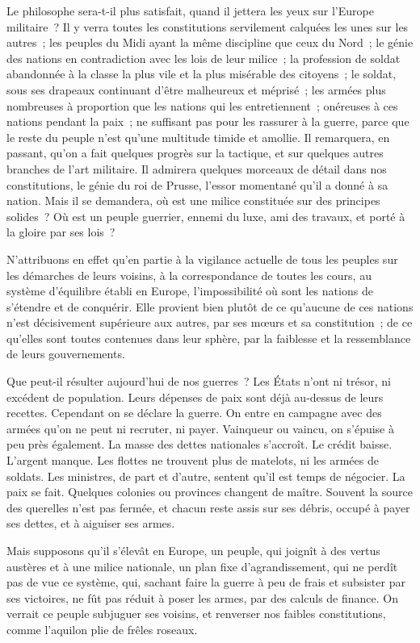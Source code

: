 \documentclass[french,twoside]{book} %
\begin{document}
Le philosophe sera-t-il plus satisfait, quand il jettera les yeux sur l’Europe militaire ? Il y verra toutes les constitutions servilement calquées les unes sur les autres ; les peuples du Midi ayant la même discipline que ceux du Nord ; le génie des nations en contradiction avec les lois de leur milice ; la profession de soldat abandonnée à la classe la plus vile et la plus misérable des citoyens ; le soldat, sous ses drapeaux continuant d’être malheureux et méprisé ; les armées plus nombreuses à proportion que les nations qui les entretiennent ; onéreuses à ces nations pendant la paix ; ne suffisant pas pour les rassurer à la guerre, parce que le reste du peuple n’est qu’une multitude timide et amollie. Il remarquera, en passant, qu’on a fait quelques progrès sur la tactique, et sur quelques autres branches de l’art militaire. Il admirera quelques morceaux de détail dans nos constitutions, le génie du roi de Prusse, l’essor momentané qu’il a donné à sa nation. Mais il se demandera, où est une milice constituée sur des principes solides ? Où est un peuple guerrier, ennemi du luxe, ami des travaux, et porté à la gloire par ses lois ?\par
N’attribuons en effet qu’en partie à la vigilance actuelle de tous les peuples sur les démarches de leurs voisins, à la correspondance de toutes les cours, au système d’équilibre établi en Europe, l’impossibilité où sont les nations de s’étendre et de conquérir. Elle provient bien plutôt de ce qu’aucune de ces nations n’est décisivement supérieure aux autres, par ses mœurs et sa constitution ; de ce qu’elles sont toutes contenues dans leur sphère, par la faiblesse et la ressemblance de leurs gouvernements.\par
Que peut-il résulter aujourd’hui de nos guerres ? Les États n’ont ni trésor, ni excédent de population. Leurs dépenses de paix sont déjà au-dessus de leurs recettes. Cependant on se déclare la guerre. On entre en campagne avec des armées qu’on ne peut ni recruter, ni payer. Vainqueur ou vaincu, on s’épuise à peu près également. La masse des dettes nationales s’accroît. Le crédit baisse. L’argent manque. Les flottes ne trouvent plus de matelots, ni les armées de soldats. Les ministres, de part et d’autre, sentent qu’il est temps de négocier. La paix se fait. Quelques colonies ou provinces changent de maître. Souvent la source des querelles n’est pas fermée, et chacun reste assis sur ses débris, occupé à payer ses dettes, et à aiguiser ses armes.\par
Mais supposons qu’il s’élevât en Europe, un peuple, qui joignît à des vertus austères et à une milice nationale, un plan fixe d’agrandissement, qui ne perdît pas de vue ce système, qui, sachant faire la guerre à peu de frais et subsister par ses victoires, ne fût pas réduit à poser les armes, par des calculs de finance. On verrait ce peuple subjuguer ses voisins, et renverser nos faibles constitutions, comme l’aquilon plie de frêles roseaux.\par
\end{document}
